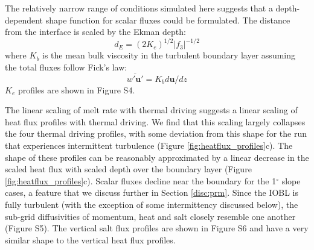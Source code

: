 \documentclass[draft]{agujournal2019}
\begin{document}
The relatively narrow range of conditions simulated here suggests that a depth-dependent shape function for scalar fluxes could be formulated. The distance from the interface is scaled by the Ekman depth:
\begin{equation}
    d_E = (2 K_e)^{1/2} |f_3|^{-1/2}
\end{equation}
where $K_{b}$ is the mean bulk viscosity in the turbulent boundary layer assuming the total fluxes follow Fick's law:
\begin{equation}
    \overline{w'\mathbf{u}'} = K_{b} d\mathbf{u}/dz
\end{equation}
$K_e$ profiles are shown in Figure S4. 

The linear scaling of melt rate with thermal driving suggests a linear scaling of heat flux profiles with thermal driving. We find that this scaling largely collapses the four thermal driving profiles, with some deviation from this shape for the run that experiences intermittent turbulence (Figure \ref{fig:heatflux_profiles}c). The shape of these profiles can be reasonably approximated by a linear decrease in the scaled heat flux with scaled depth over the boundary layer (Figure \ref{fig:heatflux_profiles}c). Scalar fluxes decline near the boundary for the 1$^{\circ}$ slope cases, a feature that we discuss further in Section \ref{disc:prm}. Since the IOBL is fully turbulent (with the exception of some intermittency discussed below), the sub-grid diffusivities of momentum, heat and salt closely resemble one another (Figure S5). The vertical salt flux profiles are shown in Figure S6 and have a very similar shape to the vertical heat flux profiles.
\end{document}
